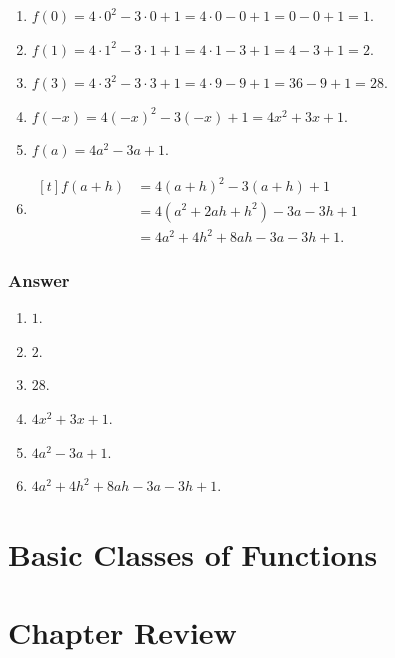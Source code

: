 \documentclass[11pt, letterpaper, oneside]{memoir}
\begin{document}
\begin{enumerate}[label=(\alph*)]
  \item $ f(0) = 4 \cdot 0^2 - 3 \cdot 0 + 1 = 4 \cdot 0 - 0 + 1 = 0 - 0 + 1 = 1 $.
  \item $ f(1) = 4 \cdot 1^2 - 3 \cdot 1 + 1 = 4 \cdot 1 - 3 + 1 = 4 - 3 + 1 = 2 $.
  \item $ f(3) = 4 \cdot 3^2 - 3 \cdot 3 + 1 = 4 \cdot 9 - 9 + 1 = 36 - 9 + 1 = 28 $.
  \item $ f(-x) = 4(-x)^2 - 3(-x) + 1 = 4x^2 + 3x + 1 $.
  \item $ f(a) = 4a^2 - 3a + 1 $.
  \item
    \(
      \begin{aligned}[t]
        f(a + h) &= 4(a + h)^2 - 3(a + h) + 1 \\
        &= 4(a^2 + 2ah + h^2) - 3a - 3h + 1 \\
        &= 4a^2 + 4h^2 + 8ah -3a - 3h + 1.
      \end{aligned}
    \)

\end{enumerate}

\subsubsection{Answer}

\begin{enumerate}[label=(\alph*)]
  \item $ 1 $.
  \item $ 2 $.
  \item $ 28 $.
  \item $ 4x^2 + 3x + 1 $.
  \item $ 4a^2 - 3a + 1 $.
  \item $ 4a^2 + 4h^2 + 8ah -3a - 3h + 1 $.
\end{enumerate}











\section{Basic Classes of Functions}



\section{Chapter Review}



\end{document}
